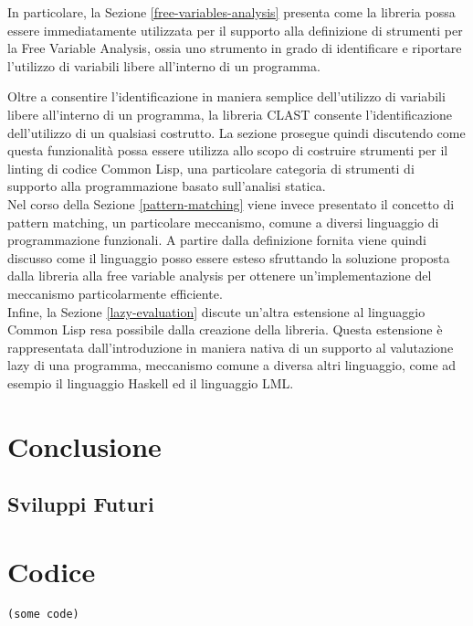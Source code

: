 \documentclass{book}
\begin{document}
In particolare, la Sezione \ref{free-variables-analysis} presenta come la
libreria possa essere immediatamente utilizzata per il supporto alla definizione
di strumenti per la Free Variable Analysis, ossia uno strumento in grado di
identificare e riportare l'utilizzo di variabili libere all'interno di un
programma.

Oltre a consentire l'identificazione in maniera semplice dell'utilizzo di
variabili libere all'interno di un programma, la libreria CLAST consente
l'identificazione dell'utilizzo di un qualsiasi costrutto. La sezione prosegue
quindi discutendo come questa funzionalità possa essere utilizza allo scopo di
costruire strumenti per il linting di codice Common Lisp, una particolare
categoria di strumenti di supporto alla programmazione basato sull'analisi
statica.\\

Nel corso della Sezione \ref{pattern-matching} viene invece presentato il
concetto di pattern matching, un particolare meccanismo, comune a diversi
linguaggio di programmazione funzionali. A partire dalla definizione fornita
viene quindi discusso come il linguaggio posso essere esteso sfruttando la
soluzione proposta dalla libreria alla free variable analysis per ottenere
un'implementazione del meccanismo particolarmente efficiente.\\

Infine, la Sezione \ref{lazy-evaluation} discute un'altra estensione al
linguaggio Common Lisp resa possibile dalla creazione della libreria. Questa
estensione è rappresentata dall'introduzione in maniera nativa di un supporto al
valutazione lazy di una programma, meccanismo comune a diversa altri linguaggio,
come ad esempio il linguaggio Haskell ed il linguaggio LML.





\chapter{Conclusione}
\section{Sviluppi Futuri}

\appendix

\chapter{Codice}

\begin{lstlisting}
(some code)
\end{lstlisting}

\printbibliography[filter=papers,title={Articoli Citati}]
\printbibliography[type=book,title={Bibliografia}]
\printbibliography[type=misc,title={Sitografia}]
\end{document}
